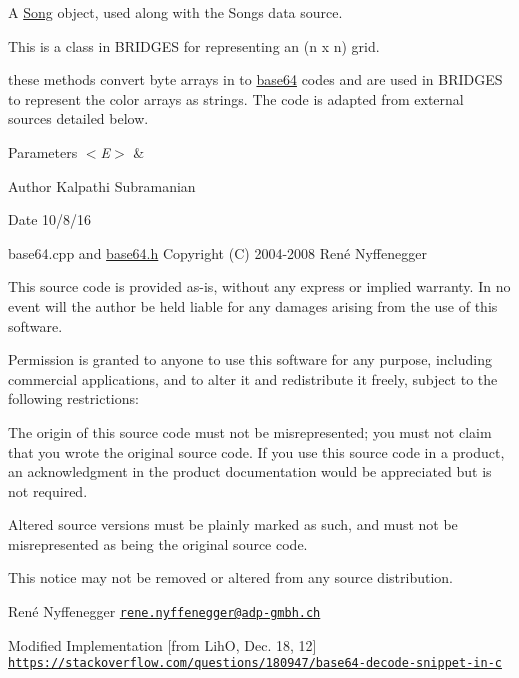 A \hyperlink{classbridges_1_1_song}{Song} object, used along with the Songs data source.

This is a class in B\+R\+I\+D\+G\+E\+S for representing an (n x n) grid.

these methods convert byte arrays in to \hyperlink{namespacebridges_1_1base64}{base64} codes and are used in B\+R\+I\+D\+G\+E\+S to represent the color arrays as strings. The code is adapted from external sources detailed below.


\begin{DoxyParams}{Parameters}
{\em $<$\+E$>$} & \\
\hline
\end{DoxyParams}
\begin{DoxyAuthor}{Author}
Kalpathi Subramanian 
\end{DoxyAuthor}
\begin{DoxyDate}{Date}
10/8/16
\end{DoxyDate}
base64.\+cpp and \hyperlink{base64_8h}{base64.\+h} Copyright (C) 2004-\/2008 René Nyffenegger

This source code is provided \textquotesingle{}as-\/is\textquotesingle{}, without any express or implied warranty. In no event will the author be held liable for any damages arising from the use of this software.

Permission is granted to anyone to use this software for any purpose, including commercial applications, and to alter it and redistribute it freely, subject to the following restrictions\+:


\begin{DoxyEnumerate}
\item The origin of this source code must not be misrepresented; you must not claim that you wrote the original source code. If you use this source code in a product, an acknowledgment in the product documentation would be appreciated but is not required.
\begin{DoxyEnumerate}
\item Altered source versions must be plainly marked as such, and must not be misrepresented as being the original source code.
\item This notice may not be removed or altered from any source distribution.
\end{DoxyEnumerate}

René Nyffenegger \href{mailto:rene.nyffenegger@adp-gmbh.ch}{\tt rene.\+nyffenegger@adp-\/gmbh.\+ch}

Modified Implementation \mbox{[}from Lih\+O, Dec. 18, 12\mbox{]} \href{https://stackoverflow.com/questions/180947/base64-decode-snippet-in-c}{\tt https\+://stackoverflow.\+com/questions/180947/base64-\/decode-\/snippet-\/in-\/c}
\end{DoxyEnumerate}


